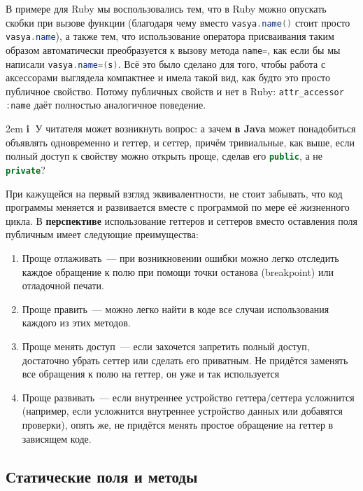 \documentclass[a4paper, 14pt, titlepage]{extarticle}
\newcommand{\strong}[1]{\textbf{#1}}
\newenvironment{indented}%
    { \begingroup %
        \noindent %
        \leftskip2em %
        \rightskip\leftskip }%
    { \par\endgroup }
\newenvironment{extrainfo}%
    { \begin{indented} %
        \color{dkblue} %
        \small %
        \textbf{\textcircled{\footnotesize i}} }%
    { \end{indented} }
\newcommand{\inlinecode}[2][Java]{\lstinline[basicstyle=\ttfamily, language=#1]{#2}}
\begin{document}
  В примере для Ruby мы воспользовались тем, что в Ruby можно опускать скобки при вызове функции
  (благодаря чему вместо \inlinecode{vasya.name()} стоит просто \inlinecode{vasya.name}), а также
  тем, что использование оператора присваивания таким образом автоматически преобразуется к вызову
  метода \inlinecode{name=}, как если бы мы написали \inlinecode{vasya.name=(s)}. Всё это было
  сделано для того, чтобы работа с аксессорами выглядела компактнее и имела такой вид, как будто это
  просто публичное свойство. Потому публичных свойств и нет в Ruby: \inlinecode{attr_accessor :name}
  даёт полностью аналогичное поведение.

  \begin{extrainfo}
    У читателя может возникнуть вопрос: а зачем \strong{в Java} может понадобиться объявлять одновременно и
    геттер, и сеттер, причём тривиальные, как выше, если полный доступ к свойству можно открыть проще,
    сделав его \inlinecode{public}, а не \inlinecode{private}?

    При кажущейся на первый взгляд эквивалентности, не стоит забывать, что код программы меняется и
    развивается вместе с программой по мере её жизненного цикла. В \strong{перспективе}
    использование геттеров и сеттеров вместо оставления поля публичным имеет следующие преимущества:

    \begin{enumerate}
      \item Проще отлаживать~--- при возникновении ошибки можно легко отследить каждое обращение к
            полю при помощи точки останова (breakpoint) или отладочной печати.
      \item Проще править~--- можно легко найти в коде все случаи использования каждого из этих методов.
      \item Проще менять доступ~--- если захочется запретить полный доступ, достаточно убрать сеттер
            или сделать его приватным. Не придётся заменять все обращения к полю на геттер, он уже и
            так используется
      \item Проще развивать~--- если внутреннее устройство геттера/сеттера усложнится (например,
            если усложнится внутреннее устройство данных или добавятся проверки), опять же, не
            придётся менять простое обращение на геттер в зависящем коде.
    \end{enumerate}
  \end{extrainfo}

  \subsection{Статические поля и методы}
\end{document}

